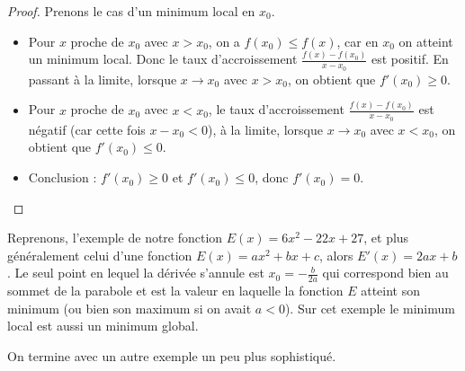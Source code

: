 \documentclass[11pt,class=report,crop=false]{standalone}
\begin{document}
\begin{proof}
Prenons le cas d'un minimum local en $x_0$.
\begin{itemize}
  \item Pour $x$ proche de $x_0$ avec $x>x_0$, on a $f(x_0) \le f(x)$, car en $x_0$ on atteint un minimum local. Donc le taux d'accroissement $\frac{f(x)-f(x_0)}{x-x_0}$ est positif. En passant à la limite, lorsque $x \to x_0$ avec $x>x_0$, on obtient que $f'(x_0) \ge 0$.
  \item Pour $x$ proche de $x_0$ avec $x<x_0$, le taux d'accroissement $\frac{f(x)-f(x_0)}{x-x_0}$ est négatif (car cette fois $x-x_0<0$), à la limite, 
 lorsque $x \to x_0$ avec $x<x_0$, on obtient que $f'(x_0) \le 0$.
 \item Conclusion : $f'(x_0) \ge 0$ et $f'(x_0) \le 0$, donc $f'(x_0)=0$.
\end{itemize}
\end{proof}


Reprenons, l'exemple de notre fonction $E(x) = 6x^2-22x+27$, et plus généralement celui d'une fonction $E(x) = ax^2+bx+c$, alors $E'(x)=2ax+b$. Le seul point en lequel la dérivée s'annule est $x_0 = -\frac{b}{2a}$ qui correspond bien au sommet de la parabole et est la valeur en laquelle la fonction $E$ atteint son minimum (ou bien son maximum si on avait $a<0$). Sur cet exemple le minimum local est aussi un minimum global.

On termine avec un autre exemple un peu plus sophistiqué.
\end{document}
